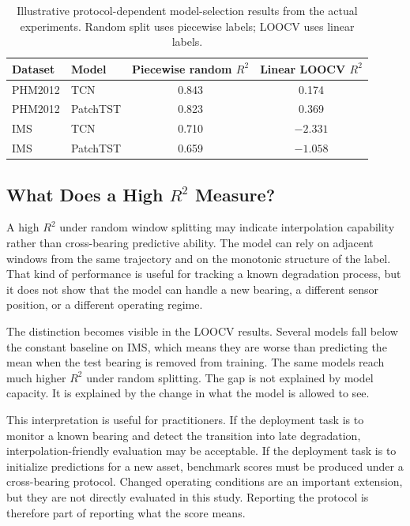 \documentclass[pdflatex,sn-mathphys-num]{sn-jnl}
\begin{document}
\begin{table}[t]
\centering
\caption{Illustrative protocol-dependent model-selection results from the actual experiments. Random split uses piecewise labels; LOOCV uses linear labels.}
\label{tab:deployment_selection}
\small
\begin{tabular}{llcc}
\toprule
Dataset & Model & Piecewise random $R^2$ & Linear LOOCV $R^2$ \\
\midrule
PHM2012 & TCN & 0.843 & 0.174 \\
PHM2012 & PatchTST & 0.823 & 0.369 \\
IMS & TCN & 0.710 & $-2.331$ \\
IMS & PatchTST & 0.659 & $-1.058$ \\
\bottomrule
\end{tabular}
\end{table}

\subsection{What Does a High $R^2$ Measure?}
A high $R^2$ under random window splitting may indicate interpolation capability rather than cross-bearing predictive ability. The model can rely on adjacent windows from the same trajectory and on the monotonic structure of the label. That kind of performance is useful for tracking a known degradation process, but it does not show that the model can handle a new bearing, a different sensor position, or a different operating regime.

The distinction becomes visible in the LOOCV results. Several models fall below the constant baseline on IMS, which means they are worse than predicting the mean when the test bearing is removed from training. The same models reach much higher $R^2$ under random splitting. The gap is not explained by model capacity. It is explained by the change in what the model is allowed to see.

This interpretation is useful for practitioners. If the deployment task is to monitor a known bearing and detect the transition into late degradation, interpolation-friendly evaluation may be acceptable. If the deployment task is to initialize predictions for a new asset, benchmark scores must be produced under a cross-bearing protocol. Changed operating conditions are an important extension, but they are not directly evaluated in this study. Reporting the protocol is therefore part of reporting what the score means.
\end{document}
